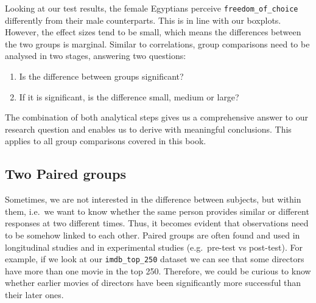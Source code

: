 \documentclass[
]{book}
\begin{document}
Looking at our test results, the female Egyptians perceive \texttt{freedom\_of\_choice} differently from their male counterparts. This is in line with our boxplots. However, the effect sizes tend to be small, which means the differences between the two groups is marginal. Similar to correlations, group comparisons need to be analysed in two stages, answering two questions:

\begin{enumerate}
\def\labelenumi{\arabic{enumi}.}
\item
  Is the difference between groups significant?
\item
  If it is significant, is the difference small, medium or large?
\end{enumerate}

The combination of both analytical steps gives us a comprehensive answer to our research question and enables us to derive with meaningful conclusions. This applies to all group comparisons covered in this book.

\hypertarget{two-paired-groups}{%
\subsection{Two Paired groups}\label{two-paired-groups}}

Sometimes, we are not interested in the difference between subjects, but within them, i.e.~we want to know whether the same person provides similar or different responses at two different times. Thus, it becomes evident that observations need to be somehow linked to each other. Paired groups are often found and used in longitudinal studies and in experimental studies (e.g.~pre-test vs post-test). For example, if we look at our \texttt{imdb\_top\_250} dataset we can see that some directors have more than one movie in the top 250. Therefore, we could be curious to know whether earlier movies of directors have been significantly more successful than their later ones.
\end{document}
